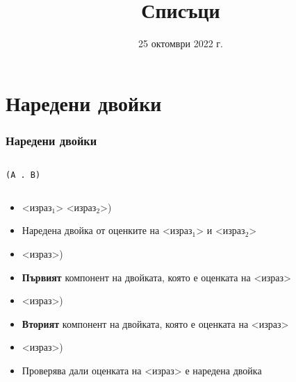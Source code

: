 \documentclass[alsotrans]{beamerswitch}
\title{Списъци}
\date{25 октомври 2022 г.}
\begin{document}
\begin{frame}
  \titlepage
\end{frame}

\section{Наредени двойки}

\begin{frame}
  \frametitle{Наредени двойки}

  \begin{columns}[t,onlytextwidth]
    \begin{column}{.5\textwidth}
      \vspace{2ex}
      \begin{center}
        \tt{(A . B)}
      \end{center}
    \end{column}
    \begin{column}{.5\textwidth}
      \begin{center}
      \end{center}
    \end{column}
  \end{columns}
  \pause
  \vspace{2ex}
  \begin{itemize}[<+->]
  \item {} <израз$_1$> <израз$_2$>\tta)
  \item Наредена двойка от оценките на <израз$_1$> и <израз$_2$>
  \item {} <израз>\tta)
  \item \textbf{Първият} компонент на двойката, която е оценката на <израз>
  \item {} <израз>\tta)
  \item \textbf{Вторият} компонент на двойката, която е оценката на <израз>
  \item {}   <израз>\tta)
  \item Проверява дали оценката на <израз> е наредена двойка
  \end{itemize}
\end{frame}
\end{document}

